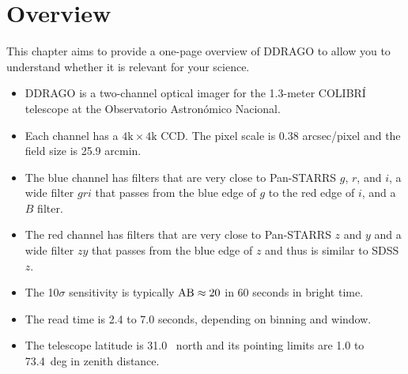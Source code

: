 \chapter{Overview}


This chapter aims to provide a one-page overview of DDRAGO to allow you to understand whether it is relevant for your science.

\begin{itemize}
    \item DDRAGO is a two-channel optical imager for the 1.3-meter COLIBRÍ telescope at the Observatorio Astronómico Nacional.
    
    \item Each channel has a $4\mathrm{k}\times4\mathrm{k}$ CCD. The pixel scale is 0.38 \unit{arcsec/pixel} and the field size is 25.9 \unit{arcmin}.

    \item The blue channel has filters that are very close to Pan-STARRS $g$, $r$, and $i$, a wide filter $gri$ that passes from the blue edge of $g$ to the red edge of $i$, and a $B$ filter. 
    
    \item The red channel has filters that are very close to Pan-STARRS $z$ and $y$ and a wide filter $zy$ that passes from the blue edge of $z$ and thus is similar to SDSS $z$.
    
    \item The 10$\sigma$ sensitivity is typically $\mbox{AB} \approx 20$ in 60 seconds in bright time.

    \item The read time is 2.4 to 7.0 seconds, depending on binning and window.
    
    \item The telescope latitude is 31.0~{\deg} north and its pointing limits are 1.0 to 73.4~{deg} in zenith distance.

\end{itemize}
